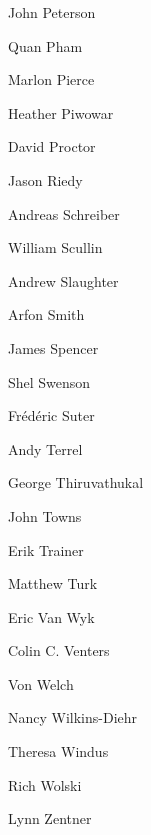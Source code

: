 \documentclass[11pt, oneside]{amsart}
\begin{document}
\begin{multicols}{4}
John Peterson

Quan Pham

Marlon Pierce

Heather Piwowar

David Proctor

Jason Riedy

Andreas Schreiber

William Scullin

Andrew Slaughter

Arfon Smith

James Spencer

Shel Swenson

Fr\'{e}d\'{e}ric Suter

Andy Terrel

George  Thiruvathukal

John Towns

Erik Trainer

Matthew Turk

Eric Van Wyk

Colin C. Venters

Von Welch

Nancy Wilkins-Diehr

Theresa Windus

Rich Wolski

Lynn Zentner

\end{multicols}






\end{document}
